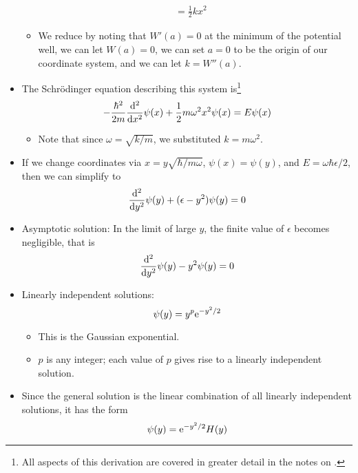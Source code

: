 \documentclass[../notes.tex]{subfiles}
\begin{document}
\begin{itemize}
\begin{align*}
        &= \frac{1}{2}kx^2
    \end{align*}
    \begin{itemize}
        \item We reduce by noting that $W'(a)=0$ at the minimum of the potential well, we can let $W(a)=0$, we can set $a=0$ to be the origin of our coordinate system, and we can let $k=W''(a)$.
    \end{itemize}
    \item The Schr\"{o}dinger equation describing this system is\footnote{All aspects of this derivation are covered in greater detail in the notes on \textcite{bib:HarmonicOscillator}.}
    \begin{equation*}
        -\frac{\hbar^2}{2m}\dv[2]{x}\psi(x)+\frac{1}{2}m\omega^2x^2\psi(x) = E\psi(x)
    \end{equation*}
    \begin{itemize}
        \item Note that since $\omega=\sqrt{k/m}$, we substituted $k=m\omega^2$.
    \end{itemize}
    \item If we change coordinates via $x=y\sqrt{\hbar/m\omega}$, $\psi(x)=\psi(y)$, and $E=\omega\hbar\epsilon/2$, then we can simplify to
    \begin{equation*}
        \dv[2]{y}\psi(y)+(\epsilon-y^2)\psi(y) = 0
    \end{equation*}
    \item Asymptotic solution: In the limit of large $y$, the finite value of $\epsilon$ becomes negligible, that is
    \begin{equation*}
        \dv[2]{y}\psi(y)-y^2\psi(y) = 0
    \end{equation*}
    \item Linearly independent solutions:
    \begin{equation*}
        \psi(y) = y^p\e[-y^2/2]
    \end{equation*}
    \begin{itemize}
        \item This is the Gaussian exponential.
        \item $p$ is any integer; each value of $p$ gives rise to a linearly independent solution.
    \end{itemize}
    \item Since the general solution is the linear combination of all linearly independent solutions, it has the form
    \begin{equation*}
        \psi(y) = \e[-y^2/2]H(y)

\end{equation*}
\end{itemize}
\end{document}
